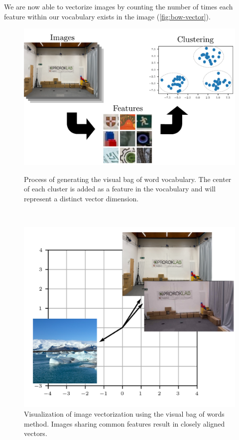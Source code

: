We are now able to vectorize images by counting the number of times each feature within our vocabulary exists in the image (\autoref{fig:bow-vector}).

\begin{figure}[h]
    \captionsetup{format=plain}
    \begin{minipage}[t]{0.55\linewidth}
        \centering
        \includegraphics[width=\linewidth]{figures/bow_vocab.pdf}

        \caption{Process of generating the visual bag of word vocabulary. The center of each cluster is added as a feature in the vocabulary and will represent a distinct vector dimension.}
        \label{fig:bow-vocab}
    \end{minipage}\hfill%
    ~
    \begin{minipage}[t]{0.4\linewidth}
        \centering
        \includegraphics[width=\linewidth]{figures/bow.pdf}
        \caption{Visualization of image vectorization using the visual bag of words method. Images sharing common features result in closely aligned vectors.}
        \label{fig:bow-vector}
    \end{minipage}
\end{figure}



